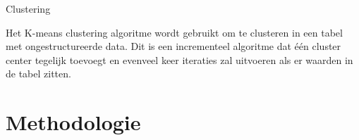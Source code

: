 Clustering


Het K-means clustering algoritme wordt gebruikt om te clusteren in een tabel met ongestructureerde data. Dit is een incrementeel algoritme dat één cluster center tegelijk toevoegt en evenveel keer iteraties zal uitvoeren als er waarden in de tabel zitten.






%



\section{Methodologie}%
\label{sec:methodologie}

